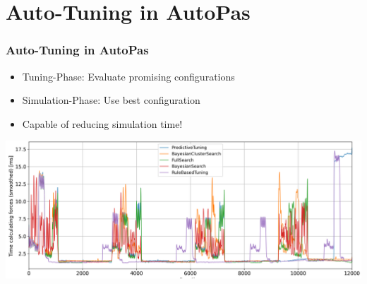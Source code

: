 \documentclass[
	10pt,
	t		%
]{beamer}
\begin{document}
\section{Auto-Tuning in AutoPas}

\begin{frame}
    \frametitle{Auto-Tuning in AutoPas}

    \begin{itemize}
        \item Tuning-Phase: Evaluate promising configurations
        \item Simulation-Phase: Use best configuration
        \item Capable of reducing simulation time!
    \end{itemize}

    \vspace{0.2cm}

    \begin{center}
        \includegraphics[width=1\textwidth]{figures/timing.png}
    \end{center}
\end{frame}



\end{document}
